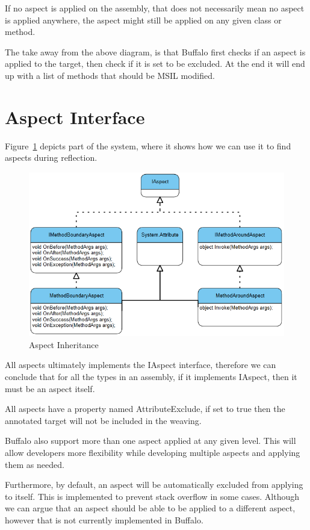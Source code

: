 If no aspect is applied on the assembly, that does not necessarily mean no aspect is applied anywhere, the aspect might still be applied on any given class or method.

The take away from the above diagram, is that Buffalo first checks if an aspect is applied to the target, then check if it is set to be excluded. At the end it will end up with a list of methods that should be MSIL modified.

\section{Aspect Interface}

Figure~\ref{uml01} depicts part of the system, where it shows how we can use it to find aspects during reflection.

\begin{figure}[H]
  \includegraphics[scale=1.0]{Uml01.PNG}
  \centering
  \caption{Aspect Inheritance\label{uml01}}
\end{figure}

All aspects ultimately implements the IAspect interface, therefore we can conclude that for all the types in an assembly, if it implements IAspect, then it must be an aspect itself.

All aspects have a property named AttributeExclude, if set to true then the annotated target will not be included in the weaving.

Buffalo also support more than one aspect applied at any given level. This will allow developers more flexibility while developing multiple aspects and applying them as needed.

Furthermore, by default, an aspect will be automatically excluded from applying to itself. This is implemented to prevent stack overflow in some cases. Although we can argue that an aspect should be able to be applied to a different aspect, however that is not currently implemented in Buffalo.

